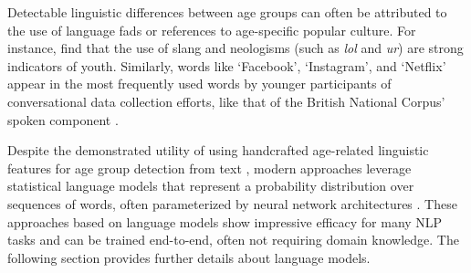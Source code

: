 Detectable linguistic differences between age groups can often be attributed to the use of language fads or references to age-specific popular culture. For instance, \cite{schler2006effects} find that the use of slang and neologisms (such as \textit{lol} and \textit{ur}) are strong indicators of youth. Similarly, words like `Facebook', `Instagram', and `Netflix' appear in the most frequently used words by younger participants of conversational data collection efforts, like that of the British National Corpus' spoken component \citep{love-spoken-bnc-2014}.

Despite the demonstrated utility of using handcrafted age-related linguistic features for age group detection from text \citep{schler2006effects}, modern approaches leverage statistical language models that represent a probability distribution over sequences of words, often parameterized by neural network architectures \citep{zheng2019personalized}. These approaches based on language models show impressive efficacy for many NLP tasks and can be trained end-to-end, often not requiring domain knowledge. The following section provides further details about language models.



